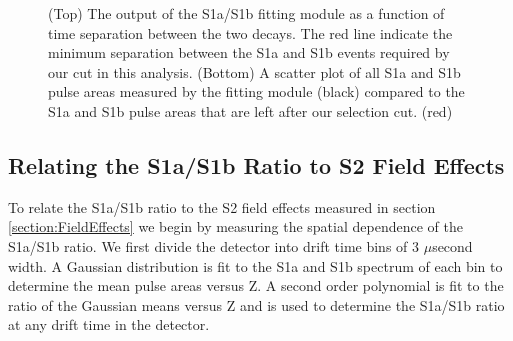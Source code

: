 \documentclass[a4paper,10pt,twocolumn]{article}
\begin{document}
\begin{figure} [!h]
\centering
{}
\qquad
{}
\caption{ (Top) The output of the S1a/S1b fitting module as a function of time separation between the two decays.  The red line indicate the minimum separation between the S1a and S1b events required by our cut in this analysis. (Bottom) A scatter plot of all S1a and S1b pulse areas measured by the fitting module (black) compared to the S1a and S1b pulse areas that are left after our selection cut. (red)}
\label{fig:S1aS1btiming}
\end{figure}

\subsection{Relating the S1a/S1b Ratio to S2 Field Effects} \label{section:S1aS1b2}

To relate the S1a/S1b ratio to the S2 field effects measured in section \ref{section:FieldEffects} we begin by measuring the spatial dependence of the S1a/S1b ratio.  We first divide the detector into drift time bins of 3 $\mu$second width.   A Gaussian distribution is fit to the S1a and S1b spectrum of each bin to determine the mean pulse areas versus Z.   A second order polynomial is fit to the ratio of the Gaussian means versus Z and is used to determine the S1a/S1b ratio at any drift time in the detector.  
\end{document}
